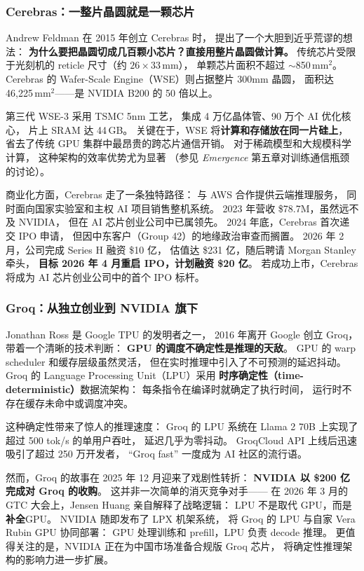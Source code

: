 \subsubsection{Cerebras：一整片晶圆就是一颗芯片}

Andrew Feldman 在 2015 年创立 Cerebras 时，
提出了一个大胆到近乎荒谬的想法：
\textbf{为什么要把晶圆切成几百颗小芯片？直接用整片晶圆做计算。}
传统芯片受限于光刻机的 reticle 尺寸（约 $26 \times 33$\,mm），
单颗芯片面积不超过 $\sim$850\,mm$^2$。
Cerebras 的 Wafer-Scale Engine（WSE）则占据整片 300mm 晶圆，
面积达 46,225\,mm$^2$——是 NVIDIA B200 的 50 倍以上。

第三代 WSE-3 采用 TSMC 5nm 工艺，
集成 4 万亿晶体管、90 万个 AI 优化核心，
片上 SRAM 达 44\,GB。
关键在于，WSE 将\textbf{计算和存储放在同一片硅上}，
省去了传统 GPU 集群中最昂贵的跨芯片通信开销。
对于稀疏模型和大规模科学计算，
这种架构的效率优势尤为显著
（参见 \textit{Emergence} 第五章对训练通信瓶颈的讨论）。

商业化方面，Cerebras 走了一条独特路径：
与 AWS 合作提供云端推理服务，
同时面向国家实验室和主权 AI 项目销售整机系统。
2023 年营收 \$78.7M，虽然远不及 NVIDIA，
但在 AI 芯片创业公司中已属领先。
2024 年底，Cerebras 首次递交 IPO 申请，
但因中东客户（Group 42）的地缘政治审查而搁置。
2026 年 2 月，公司完成 Series H 融资 \$10 亿，
估值达 \$231 亿，随后聘请 Morgan Stanley 牵头，
\textbf{目标 2026 年 4 月重启 IPO，计划融资 \$20 亿}。
若成功上市，Cerebras 将成为 AI 芯片创业公司中的首个 IPO 标杆。

\subsubsection{Groq：从独立创业到 NVIDIA 旗下}

Jonathan Ross 是 Google TPU 的发明者之一，
2016 年离开 Google 创立 Groq，
带着一个清晰的技术判断：
\textbf{GPU 的调度不确定性是推理的天敌}。
GPU 的 warp scheduler 和缓存层级虽然灵活，
但在实时推理中引入了不可预测的延迟抖动。
Groq 的 Language Processing Unit（LPU）采用
\textbf{时序确定性（time-deterministic）}数据流架构：
每条指令在编译时就确定了执行时间，
运行时不存在缓存未命中或调度冲突。

这种确定性带来了惊人的推理速度：
Groq 的 LPU 系统在 Llama 2 70B 上实现了超过 500 tok/s 的单用户吞吐，
延迟几乎为零抖动。
GroqCloud API 上线后迅速吸引了超过 250 万开发者，
``Groq fast'' 一度成为 AI 社区的流行语。

然而，Groq 的故事在 2025 年 12 月迎来了戏剧性转折：
\textbf{NVIDIA 以 \$200 亿完成对 Groq 的收购}。
这并非一次简单的消灭竞争对手——
在 2026 年 3 月的 GTC 大会上，Jensen Huang 亲自解释了战略逻辑：
LPU 不是取代 GPU，而是\textbf{补全}GPU。
NVIDIA 随即发布了 LPX 机架系统，
将 Groq 的 LPU 与自家 Vera Rubin GPU 协同部署：
GPU 处理训练和 prefill，LPU 负责 decode 推理。
更值得关注的是，NVIDIA 正在为中国市场准备合规版 Groq 芯片，
将确定性推理架构的影响力进一步扩展。

